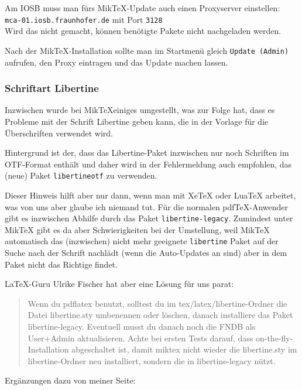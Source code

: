 Am IOSB muss man fürs Mik\TeX-Update auch einen Proxyserver einstellen:\\
 \texttt{mca-01.iosb.fraunhofer.de} mit Port \texttt{3128}\\
Wird das nicht gemacht, können benötigte Pakete nicht nachgeladen werden.

Nach der Mik\TeX-Installation sollte man im Startmenü gleich \texttt{Update (Admin)} aufrufen, den Proxy eintragen und das Update machen lassen.

\subsubsection{Schriftart Libertine}

Inzwischen wurde bei Mik\TeX einiges umgestellt, was zur Folge hat, dass es Probleme mit der Schrift Libertine geben kann, die in der Vorlage für die Überschriften verwendet wird.

Hintergrund ist der, dass das Libertine-Paket inzwischen nur noch Schriften im OTF-Format enthält und daher wird in der Fehlermeldung auch empfohlen, das (neue) Paket
\texttt{libertineotf} zu verwenden.

Dieser Hinweis hilft aber nur dann, wenn man mit XeTeX oder LuaTeX arbeitet, was von uns aber glaube ich niemand tut. Für die normalen pdfTeX-Anwender gibt es inzwischen Abhilfe durch das Paket \texttt{libertine-legacy}. Zumindest unter MikTeX gibt es da aber Schwierigkeiten bei der Umstellung, weil MikTeX automatisch das (inzwischen) nicht mehr geeignete \texttt{libertine} Paket auf der Suche nach der Schrift nachlädt (wenn die Auto-Updates an sind) aber in dem Paket nicht das Richtige findet.

LaTeX-Guru Ulrike Fischer hat aber eine Lösung für uns parat:

\begin{quotation}
Wenn du pdflatex benutzt, solltest du im tex/latex/libertine-Ordner die Datei libertine.sty umbenennen oder löschen, danach installiere das Paket libertine-legacy. Eventuell musst du danach noch die FNDB als User+Admin aktualisieren. Achte bei ersten Tests darauf, dass on-the-fly-Installation abgeschaltet ist, damit miktex nicht wieder die libertine.sty im libertine-Ordner neu installiert, sondern die in libertine-legacy nützt.
\end{quotation}

Ergänzungen dazu von meiner Seite:


